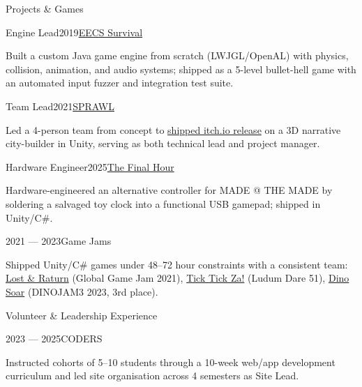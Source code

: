 \documentclass{resume}
\begin{document}
\begin{rSection}{Projects \& Games}

\begin{rSubsection}{Engine Lead}{2019}{\href{https://github.com/justinro-underscore/EECSurvival-Game}{EECS Survival}}{}
\item Built a custom Java game engine from scratch (LWJGL/OpenAL) with physics, collision, animation, and audio systems; shipped as a 5-level bullet-hell game with an automated input fuzzer and integration test suite.
\end{rSubsection}

\begin{rSubsection}{Team Lead}{2021}{\href{https://chemelia.itch.io/sprawl}{SPRAWL}}{}
\item Led a 4-person team from concept to \href{https://chemelia.itch.io/sprawl}{shipped itch.io release} on a 3D narrative city-builder in Unity, serving as both technical lead and project manager.
\end{rSubsection}

\begin{rSubsection}{Hardware Engineer}{2025}{\href{https://clayxavier.itch.io/the-final-hour}{The Final Hour}}{}
\item Hardware-engineered an alternative controller for MADE @ THE MADE by soldering a salvaged toy clock into a functional USB gamepad; shipped in Unity/C\#.
\end{rSubsection}

\begin{rSubsection}{}{2021 --- 2023}{Game Jams}{}
\item Shipped Unity/C\# games under 48--72 hour constraints with a consistent team: \href{https://justinro-underscore.itch.io/lost-raturn}{Lost \& Raturn} (Global Game Jam 2021), \href{https://justinro-underscore.itch.io/tick-tick-za}{Tick Tick Za!} (Ludum Dare 51), \href{https://justinro-underscore.itch.io/dino-soar}{Dino Soar} (DINOJAM3 2023, 3rd place).
\end{rSubsection}

\end{rSection}


\begin{rSection}{Volunteer \& Leadership Experience}

\begin{rSubsection}{}{2023 --- 2025}{CODERS}{}
\item Instructed cohorts of 5--10 students through a 10-week web/app development curriculum and led site organisation across 4 semesters as Site Lead.
\end{rSubsection}

\end{rSection}
\end{document}
